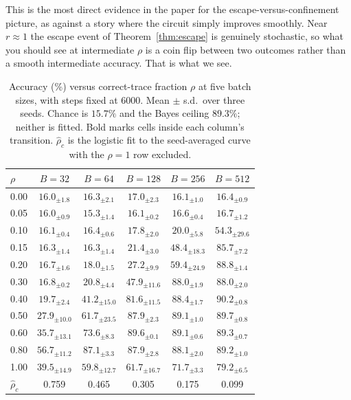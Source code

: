 \documentclass{article}
\theoremstyle{plain}
\theoremstyle{definition}
\theoremstyle{remark}
\newcommand{\1}{\mathbf{1}}
\begin{document}
This is the most direct evidence in the paper for the escape-versus-confinement
picture, as against a story where the circuit simply improves smoothly. Near
$r\approx1$ the escape event of Theorem~\ref{thm:escape} is genuinely stochastic,
so what you should see at intermediate $\rho$ is a coin flip between two outcomes
rather than a smooth intermediate accuracy. That is what we see.

\begin{table}[t]
\caption{Accuracy (\%) versus correct-trace fraction $\rho$ at five batch sizes,
with steps fixed at $6000$. Mean $\pm$ s.d.\ over three seeds. Chance is $15.7\%$
and the Bayes ceiling $89.3\%$; neither is fitted. Bold marks cells inside each
column's transition. $\hat\rho_c$ is the logistic fit to the seed-averaged curve
with the $\rho = 1$ row excluded.}
\label{tab:batchsweep}
\centering
\small
\begin{tabular}{lccccc}
\toprule
$\rho$ & $B=32$ & $B=64$ & $B=128$ & $B=256$ & $B=512$ \\
\midrule
0.00 & $16.0_{\pm1.8}$ & $16.3_{\pm2.1}$ & $17.0_{\pm2.3}$ & $16.1_{\pm1.0}$ & $16.4_{\pm0.9}$ \\
0.05 & $16.0_{\pm0.9}$ & $15.3_{\pm1.4}$ & $16.1_{\pm0.2}$ & $16.6_{\pm0.4}$ & $16.7_{\pm1.2}$ \\
0.10 & $16.1_{\pm0.4}$ & $16.4_{\pm0.6}$ & $17.8_{\pm2.0}$ & $20.0_{\pm5.8}$ & $\mathbf{54.3}_{\pm29.6}$ \\
0.15 & $16.3_{\pm1.4}$ & $16.3_{\pm1.4}$ & $21.4_{\pm3.0}$ & $\mathbf{48.4}_{\pm18.3}$ & $\mathbf{85.7}_{\pm7.2}$ \\
0.20 & $16.7_{\pm1.6}$ & $18.0_{\pm1.5}$ & $\mathbf{27.2}_{\pm9.9}$ & $\mathbf{59.4}_{\pm24.9}$ & $88.8_{\pm1.4}$ \\
0.30 & $16.8_{\pm0.2}$ & $20.8_{\pm4.4}$ & $\mathbf{47.9}_{\pm11.6}$ & $88.0_{\pm1.9}$ & $88.0_{\pm2.0}$ \\
0.40 & $19.7_{\pm2.4}$ & $\mathbf{41.2}_{\pm15.0}$ & $\mathbf{81.6}_{\pm11.5}$ & $88.4_{\pm1.7}$ & $90.2_{\pm0.8}$ \\
0.50 & $\mathbf{27.9}_{\pm10.0}$ & $\mathbf{61.7}_{\pm23.5}$ & $87.9_{\pm2.3}$ & $89.1_{\pm1.0}$ & $89.7_{\pm0.8}$ \\
0.60 & $\mathbf{35.7}_{\pm13.1}$ & $\mathbf{73.6}_{\pm8.3}$ & $89.6_{\pm0.1}$ & $89.1_{\pm0.6}$ & $89.3_{\pm0.7}$ \\
0.80 & $\mathbf{56.7}_{\pm11.2}$ & $87.1_{\pm3.3}$ & $87.9_{\pm2.8}$ & $88.1_{\pm2.0}$ & $89.2_{\pm1.0}$ \\
1.00 & $39.5_{\pm14.9}$ & $59.8_{\pm12.7}$ & $61.7_{\pm16.7}$ & $71.7_{\pm3.3}$ & $79.2_{\pm6.5}$ \\
\midrule
$\hat\rho_c$ & 0.759 & 0.465 & 0.305 & 0.175 & 0.099 \\
\bottomrule
\end{tabular}
\end{table}
\end{document}
